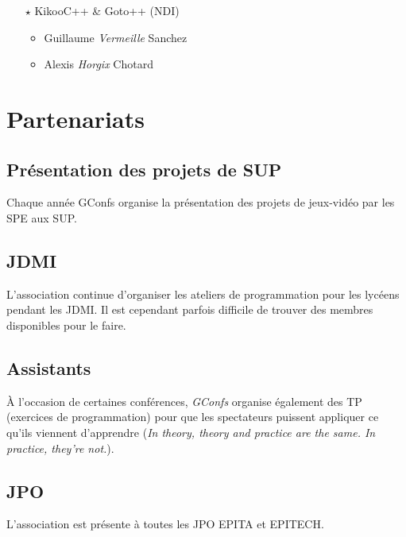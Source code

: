 \documentclass[a4paper]{article}
\begin{document}
\begin{multicols*}{2}
\begin{itemize}
            \vspace{0.3cm}

        \item[$\star$] KikooC++ \& Goto++ (NDI)
            \begin{itemize}
                \item Guillaume \emph{Vermeille} Sanchez
                \item Alexis \emph{Horgix} Chotard
            \end{itemize}

            \vspace{0.3cm}
    \end{itemize}

\end{multicols*}

\section{Partenariats}

\subsection{Présentation des projets de SUP}

Chaque année GConfs organise la présentation des projets de jeux-vidéo par les
SPE aux SUP.

\subsection{JDMI}

L'association continue d'organiser les ateliers de programmation pour les
lycéens pendant les JDMI. Il est cependant parfois difficile de trouver des
membres disponibles pour le faire.

\subsection{Assistants}

À l'occasion de certaines conférences, \emph{GConfs} organise également des TP
(exercices de programmation) pour que les spectateurs puissent appliquer ce
qu'ils viennent d'apprendre (\emph{In theory, theory and practice are the same.
In practice, they’re not.}).

\subsection{JPO}

L'association est présente à toutes les JPO EPITA et EPITECH.


\end{document}

